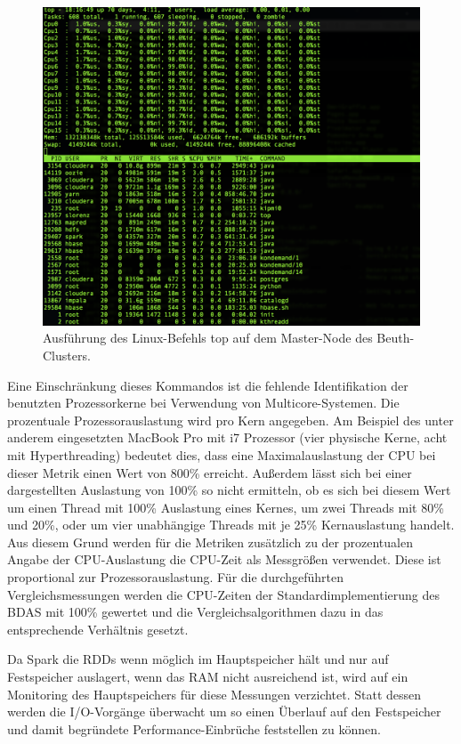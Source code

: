 \begin{figure}[htb!]
\centering
\includegraphics[width=1.0\textwidth]{bilder/top_cluster.png}
\caption{Ausführung des Linux-Befehls top auf dem Master-Node des Beuth-Clusters.}
\label{fig:topcluster}
\end{figure}    

Eine Einschränkung dieses Kommandos ist die fehlende Identifikation der benutzten Prozessorkerne bei Verwendung von Multicore-Systemen. Die prozentuale Prozessorauslastung wird pro Kern angegeben. Am Beispiel des unter anderem eingesetzten MacBook Pro mit i7 Prozessor (vier physische Kerne, acht mit Hyperthreading) bedeutet dies, dass eine Maximalauslastung der CPU bei dieser Metrik einen Wert von 800\% erreicht. Außerdem lässt sich bei einer dargestellten Auslastung von 100\% so nicht ermitteln, ob es sich bei diesem Wert um einen Thread mit 100\% Auslastung eines Kernes, um zwei Threads mit 80\% und 20\%, oder um vier unabhängige Threads mit je 25\% Kernauslastung handelt. Aus diesem Grund werden für die Metriken zusätzlich zu der prozentualen Angabe der CPU-Auslastung die CPU-Zeit als Messgrößen verwendet. Diese ist proportional zur Prozessorauslastung. Für die durchgeführten Vergleichsmessungen werden die CPU-Zeiten der Standardimplementierung des BDAS mit 100\% gewertet und die Vergleichsalgorithmen dazu in das entsprechende Verhältnis gesetzt.  

Da Spark die RDDs wenn möglich im Hauptspeicher hält und nur auf Festspeicher auslagert, wenn das RAM nicht ausreichend ist, wird auf ein Monitoring des Hauptspeichers für diese Messungen verzichtet. Statt dessen werden die I/O-Vorgänge überwacht um so einen Überlauf auf den Festspeicher und damit begründete Performance-Einbrüche feststellen zu können. 




